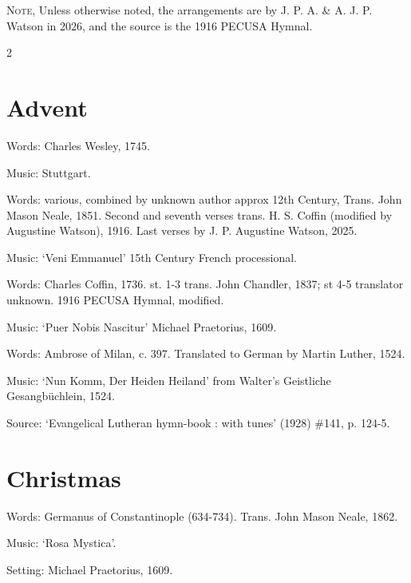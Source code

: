 \begin{rubric}
	\textsc{Note,} Unless otherwise noted, the arrangements are by J. P. A. \& A. J. P. Watson in 2026, and the  source is the 1916 PECUSA Hymnal.
\end{rubric}

\clearpage
\footnotesize
\begin{multicols}{2}
\sloppy

\section*{Advent}
\par\noindent
Words: Charles Wesley, 1745.
\par\noindent
Music: Stuttgart.


\par\noindent
Words: various, combined by unknown author approx 12th Century, Trans. John Mason Neale, 1851. Second and seventh verses trans. H. S. Coffin (modified by Augustine Watson), 1916. Last verses by J. P. Augustine Watson, 2025.
\par\noindent
Music: `Veni Emmanuel' 15th Century French processional.


\par\noindent
Words: Charles Coffin, 1736. st. 1-3 trans. John Chandler, 1837; st 4-5 translator unknown. 1916 PECUSA Hymnal, modified.
\par\noindent
Music: `Puer Nobis Nascitur' Michael Praetorius, 1609.


\par\noindent
Words: Ambrose of Milan, c. 397.  Translated to German by Martin Luther, 1524.
\par\noindent
Music: `Nun Komm, Der Heiden Heiland' from Walter's Geistliche Gesangbüchlein, 1524.
\par\noindent
Source: `Evangelical Lutheran hymn-book : with tunes' (1928) \#141, p. 124-5.


\section*{Christmas}
\par\noindent
Words: Germanus of Constantinople (634-734).  Trans. John Mason Neale, 1862. 
\par\noindent
Music: `Rosa Mystica'.
\par\noindent
Setting: Michael Praetorius, 1609.



\end{multicols}
